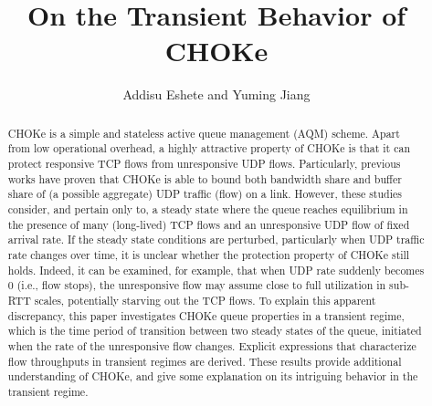 \documentclass{IEEEtran}
\begin{document}
\fontsize{10}{11.7}\rm
    \IEEEoverridecommandlockouts 

    \title{On the Transient Behavior of CHOKe}
    \author{Addisu Eshete and Yuming Jiang\\
    }
    \maketitle



    \begin{abstract}
CHOKe is a simple and stateless active queue management (AQM) scheme. Apart from low operational overhead, a highly attractive property of CHOKe is that it can protect responsive TCP flows from unresponsive UDP flows. Particularly, previous works have proven that CHOKe is able to bound both bandwidth share and buffer share of (a possible aggregate) UDP traffic (flow) on a link. However, these studies consider, and pertain only to, a steady state where the queue reaches equilibrium in the presence of many (long-lived)  TCP flows and an unresponsive UDP flow of fixed arrival rate. If the steady state conditions are perturbed, particularly when UDP traffic rate changes over time, it is unclear whether the protection property of CHOKe still holds. Indeed, it can be examined, for example, that when UDP rate suddenly becomes 0 (i.e., flow stops), the unresponsive flow may assume close to full utilization in sub-RTT scales, potentially starving out the TCP flows. To explain this apparent discrepancy, this paper investigates CHOKe queue properties in a transient regime, which is the time period of transition between two steady states of the queue, initiated when the  rate of the unresponsive flow changes. Explicit expressions that characterize flow throughputs in transient regimes are derived. These results provide additional understanding of CHOKe, and give some explanation on its intriguing behavior in the transient regime. 
    \end{abstract}
\end{document}
